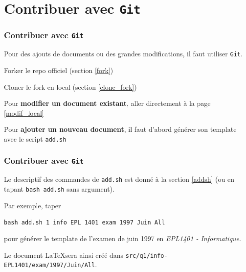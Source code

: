 \documentclass{beamer}
\newenvironment{wideitemize}{\itemize\addtolength{\itemsep}{10pt}}{\enditemize}
\begin{document}
\section{Contribuer avec \texttt{Git}}

\begin{frame}
    \frametitle{Contribuer avec \texttt{Git}}
    Pour des ajouts de documents ou des grandes modifications, il faut utiliser \texttt{Git}.
    \begin{wideitemize}
         \item Forker le repo officiel (section \ref{fork})
         \item Cloner le fork en local (section \ref{clone_fork})
         \item Pour \textbf{modifier un document existant}, aller directement à la page \ref{modif_local}
         \item Pour \textbf{ajouter un nouveau document}, il faut d'abord générer son template avec le script \texttt{add.sh}
     \end{wideitemize}
\end{frame}

\begin{frame}
    \frametitle{Contribuer avec \texttt{Git}}
    \begin{wideitemize}
         \item Le descriptif des commandes de \texttt{add.sh} est donné à la section \ref{addsh} (ou en tapant \lstinline[mathescape]|bash add.sh| sans argument). 
         
         Par exemple, taper 
         
         \lstinline[mathescape]|bash add.sh 1 info EPL 1401 exam 1997 Juin All| 
         
         pour générer le template de l'examen de juin 1997 en \textit{EPL1401 - Informatique}. 
        
         Le document \LaTeX sera ainsi créé dans \lstinline[mathescape]|src/q1/info-EPL1401/exam/1997/Juin/All|.
     \end{wideitemize}
\end{frame}
\end{document}
